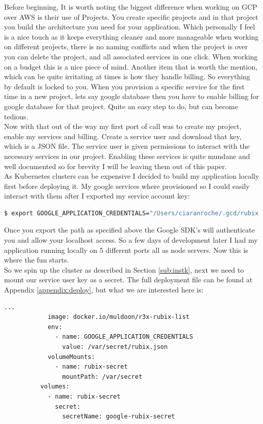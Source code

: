 Before beginning, It is worth noting the biggest difference when working on GCP over AWS is their use of Projects. You create specific projects and in that project you build the architecture you need for your application. Which personally I feel is a nice touch as it keeps everything cleaner and more manageable when working on different projects, there is no naming conflicts and when the project is over you can delete the project, and all associated services in one click. When working on a budget this is a nice piece of mind. Another item that is worth the mention, which can be quite irritating at times is how they handle billing. So everything by default is locked to you. When you provision a specific service for the first time in a new project, lets say google database then you have to enable billing for google database for that project. Quite an easy step to do, but can become tedious.
\\Now with that out of the way my first port of call was to create my project, enable my services and billing. Create a service user and download that key, which is a JSON file. The service user is given permissions to interact with the necessary services in our project. Enabling these services is quite mundane and well documented so for brevity I will be leaving them out of this paper.
\\As Kubernetes clusters can be expensive I decided to build my application locally first before deploying it. My google services where provisioned so I could easily interact with them after I exported my service account key:
\begin{lstlisting}[language=bash]
$ export GOOGLE_APPLICATION_CREDENTIALS="/Users/ciaranroche/.gcd/rubix.json"
\end{lstlisting}
Once you export the path as specified above the Google SDK's will authenticate you and allow your localhost access. So a few days of development later I had my application running locally on 5 different ports all as node servers. Now this is where the fun starts.
\\So we spin up the cluster as described in Section \ref{sub:instk}, next we need to mount our service user key as a secret. The full deployment file can be found at Appendix \ref{appendix:deploy}, but what we are interested here is:
\begin{lstlisting}[language=bash]
        ...
            image: docker.io/muldoon/r3x-rubix-list
            env:
              - name: GOOGLE_APPLICATION_CREDENTIALS
                value: /var/secret/rubix.json
            volumeMounts:
              - name: rubix-secret
                mountPath: /var/secret
          volumes:
            - name: rubix-secret
              secret:
                secretName: google-rubix-secret
\end{lstlisting}
